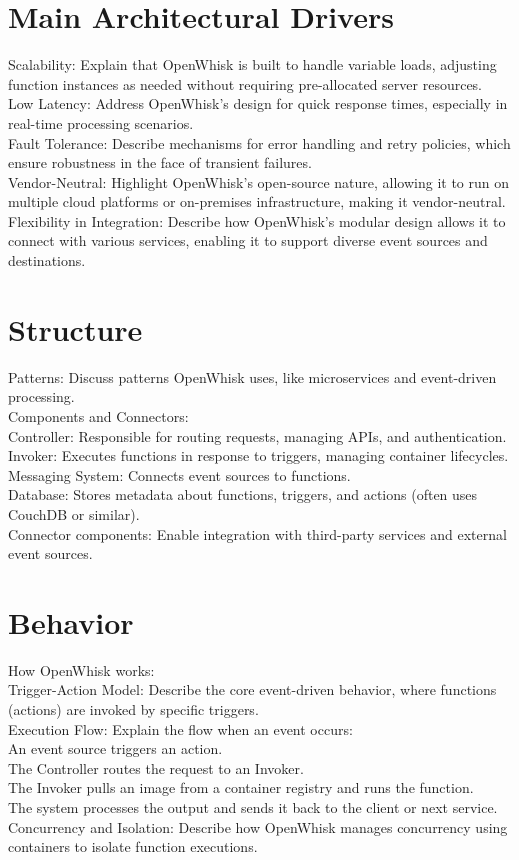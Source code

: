 \documentclass[12pt]{article}
\begin{document}
\section{Main Architectural Drivers}
Scalability: Explain that OpenWhisk is built to handle variable loads, adjusting function instances as needed without requiring pre-allocated server resources.\\
Low Latency: Address OpenWhisk’s design for quick response times, especially in real-time processing scenarios.\\
Fault Tolerance: Describe mechanisms for error handling and retry policies, which ensure robustness in the face of transient failures.\\
Vendor-Neutral: Highlight OpenWhisk’s open-source nature, allowing it to run on multiple cloud platforms or on-premises infrastructure, making it vendor-neutral.\\
Flexibility in Integration: Describe how OpenWhisk’s modular design allows it to connect with various services, enabling it to support diverse event sources and destinations.

\section{Structure}
Patterns: Discuss patterns OpenWhisk uses, like microservices and event-driven processing.\\
Components and Connectors:\\
Controller: Responsible for routing requests, managing APIs, and authentication.\\
Invoker: Executes functions in response to triggers, managing container lifecycles.\\
Messaging System: Connects event sources to functions.\\
Database: Stores metadata about functions, triggers, and actions (often uses CouchDB or similar).\\
Connector components: Enable integration with third-party services and external event sources.

\section{Behavior}
How OpenWhisk works:\\
Trigger-Action Model: Describe the core event-driven behavior, where functions (actions) are invoked by specific triggers.\\
Execution Flow: Explain the flow when an event occurs:\\
An event source triggers an action.\\
The Controller routes the request to an Invoker.\\
The Invoker pulls an image from a container registry and runs the function.\\
The system processes the output and sends it back to the client or next service.\\
Concurrency and Isolation: Describe how OpenWhisk manages concurrency using containers to isolate function executions.
\end{document}
